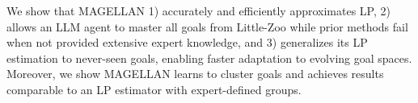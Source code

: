 We show that MAGELLAN 1) accurately and efficiently approximates LP, 2) allows an LLM agent to master all goals from Little-Zoo while prior methods fail when not provided extensive expert knowledge, and 3) generalizes its LP estimation to never-seen goals, enabling faster adaptation to evolving goal spaces. Moreover, we show MAGELLAN learns to cluster goals and achieves results comparable to an LP estimator with expert-defined groups.





